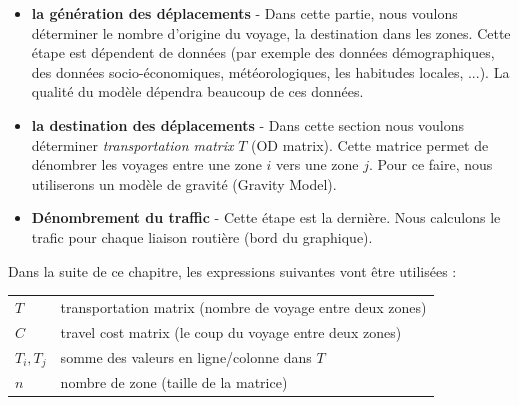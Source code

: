 \begin{itemize}
  \item[ ] \textbf{la génération des déplacements} - Dans cette partie, nous voulons déterminer le nombre d'origine du voyage, la destination dans les zones. Cette étape est dépendent de données (par exemple des données démographiques, des données socio-économiques, météorologiques, les habitudes locales, ...). La qualité du modèle dépendra beaucoup de ces données.

  \item[ ] \textbf{la destination des déplacements} - Dans cette section nous voulons déterminer \textit{transportation matrix} $T$ (OD matrix). Cette matrice permet de dénombrer les  voyages entre une zone $i$ vers une zone $j$. Pour ce faire, nous utiliserons un modèle de gravité (Gravity Model).


  \item[ ] \textbf{Dénombrement du traffic} - Cette étape est la dernière. Nous calculons le trafic pour chaque liaison routière (bord du graphique).
\end{itemize}



Dans la suite de ce chapitre, les expressions suivantes vont être utilisées :

\begin{tabular}{ll}
  $T$ & transportation matrix (nombre de voyage entre deux zones)\\
  $C$ & travel cost matrix (le coup du voyage entre deux zones) \\
  $T_i, T_j$ & somme des valeurs en ligne/colonne dans $T$\\
  $n$ & nombre de zone (taille de la matrice)
\end{tabular}




